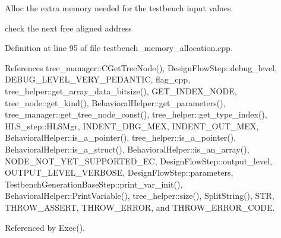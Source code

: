 Alloc the extra memory needed for the testbench input values. 

check the next free aligned address 

Definition at line 95 of file testbench\+\_\+memory\+\_\+allocation.\+cpp.



References tree\+\_\+manager\+::\+C\+Get\+Tree\+Node(), Design\+Flow\+Step\+::debug\+\_\+level, D\+E\+B\+U\+G\+\_\+\+L\+E\+V\+E\+L\+\_\+\+V\+E\+R\+Y\+\_\+\+P\+E\+D\+A\+N\+T\+IC, flag\+\_\+cpp, tree\+\_\+helper\+::get\+\_\+array\+\_\+data\+\_\+bitsize(), G\+E\+T\+\_\+\+I\+N\+D\+E\+X\+\_\+\+N\+O\+DE, tree\+\_\+node\+::get\+\_\+kind(), Behavioral\+Helper\+::get\+\_\+parameters(), tree\+\_\+manager\+::get\+\_\+tree\+\_\+node\+\_\+const(), tree\+\_\+helper\+::get\+\_\+type\+\_\+index(), H\+L\+S\+\_\+step\+::\+H\+L\+S\+Mgr, I\+N\+D\+E\+N\+T\+\_\+\+D\+B\+G\+\_\+\+M\+EX, I\+N\+D\+E\+N\+T\+\_\+\+O\+U\+T\+\_\+\+M\+EX, Behavioral\+Helper\+::is\+\_\+a\+\_\+pointer(), tree\+\_\+helper\+::is\+\_\+a\+\_\+pointer(), Behavioral\+Helper\+::is\+\_\+a\+\_\+struct(), Behavioral\+Helper\+::is\+\_\+an\+\_\+array(), N\+O\+D\+E\+\_\+\+N\+O\+T\+\_\+\+Y\+E\+T\+\_\+\+S\+U\+P\+P\+O\+R\+T\+E\+D\+\_\+\+EC, Design\+Flow\+Step\+::output\+\_\+level, O\+U\+T\+P\+U\+T\+\_\+\+L\+E\+V\+E\+L\+\_\+\+V\+E\+R\+B\+O\+SE, Design\+Flow\+Step\+::parameters, Testbench\+Generation\+Base\+Step\+::print\+\_\+var\+\_\+init(), Behavioral\+Helper\+::\+Print\+Variable(), tree\+\_\+helper\+::size(), Split\+String(), S\+TR, T\+H\+R\+O\+W\+\_\+\+A\+S\+S\+E\+RT, T\+H\+R\+O\+W\+\_\+\+E\+R\+R\+OR, and T\+H\+R\+O\+W\+\_\+\+E\+R\+R\+O\+R\+\_\+\+C\+O\+DE.



Referenced by Exec().

